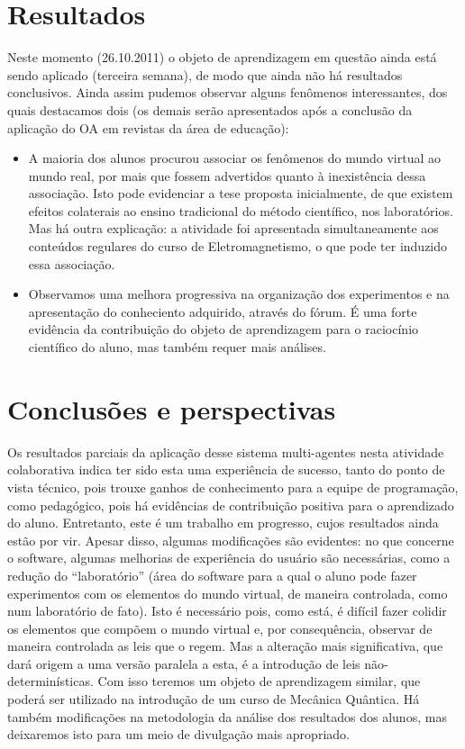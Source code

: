 \documentclass[a0,portrait]{a0poster}
\begin{document}
\section{Resultados}

Neste momento (26.10.2011) o objeto de aprendizagem em questão ainda está
sendo aplicado (terceira semana), de modo que ainda não há resultados conclusivos.
Ainda assim pudemos observar alguns fenômenos interessantes, dos quais destacamos
dois (os demais serão apresentados após a conclusão da aplicação do OA em revistas da
área de educação):

\begin{itemize}
\item A maioria dos alunos procurou associar os fenômenos do mundo virtual ao
mundo real, por mais que fossem advertidos quanto à inexistência dessa
associação. Isto pode evidenciar a tese proposta inicialmente, de que existem
efeitos colaterais ao ensino tradicional do método científico, nos laboratórios.
Mas há outra explicação: a atividade foi apresentada simultaneamente aos
conteúdos regulares do curso de Eletromagnetismo, o que pode ter induzido essa
associação.
\item Observamos uma melhora progressiva na organização dos experimentos e na
apresentação do conheciento adquirido, através do fórum. É uma forte evidência
da contribuição do objeto de aprendizagem para o raciocínio científico do aluno,
mas também requer mais análises.
\end{itemize}

\section{Conclusões e perspectivas}

Os resultados parciais da aplicação desse sistema multi-agentes nesta atividade
colaborativa indica ter sido esta uma experiência de sucesso, tanto do ponto de vista
técnico, pois trouxe ganhos de conhecimento para a equipe de programação, como
pedagógico, pois há evidências de contribuição positiva para o aprendizado do aluno.
Entretanto, este é um trabalho em progresso, cujos resultados ainda estão por
vir. Apesar disso, algumas modificações são evidentes: no que concerne o software,
algumas melhorias de experiência do usuário são necessárias, como a redução
do “laboratório” (área do software para a qual o aluno pode fazer experimentos com
os elementos do mundo virtual, de maneira controlada, como num laboratório de fato).
Isto é necessário pois, como está, é difícil fazer colidir os elementos que compõem o
mundo virtual e, por consequência, observar de maneira controlada as leis que o regem.
Mas a alteração mais significativa, que dará origem a uma versão paralela a esta, é a
introdução de leis não-determinísticas. Com isso teremos um objeto de aprendizagem
similar, que poderá ser utilizado na introdução de um curso de Mecânica Quântica.
Há também modificações na metodologia da análise dos resultados dos alunos, mas
deixaremos isto para um meio de divulgação mais apropriado.



\end{document}
